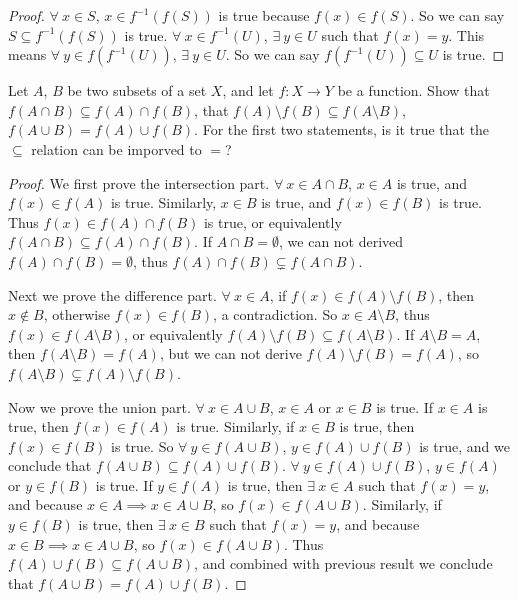 \begin{proof}
\(\forall\ x \in S\), \(x \in f^{-1}(f(S))\) is true because \(f(x) \in f(S)\).
So we can say \(S \subseteq f^{-1}(f(S))\) is true.
\(\forall\ x \in f^{-1}(U)\), \(\exists\ y \in U\) such that \(f(x) = y\).
This means \(\forall\ y \in f(f^{-1}(U))\), \(\exists\ y \in U\).
So we can say \(f(f^{-1}(U)) \subseteq U\) is true.
\end{proof}

\begin{exercise}\label{ex 3.4.3}
Let \(A\), \(B\) be two subsets of a set \(X\), and let \(f : X \to Y\) be a function.
Show that \(f(A \cap B) \subseteq f(A) \cap f(B)\), that \(f(A) \setminus f(B) \subseteq f(A \setminus B)\), \(f(A \cup B) = f(A) \cup f(B)\).
For the first two statements, is it true that the \(\subseteq\) relation can be imporved to \(=\)?
\end{exercise}

\begin{proof}
We first prove the intersection part.
\(\forall\ x \in A \cap B\), \(x \in A\) is true, and \(f(x) \in f(A)\) is true.
Similarly, \(x \in B\) is true, and \(f(x) \in f(B)\) is true.
Thus \(f(x) \in f(A) \cap f(B)\) is true, or equivalently \(f(A \cap B) \subseteq f(A) \cap f(B)\).
If \(A \cap B = \emptyset\), we can not derived \(f(A) \cap f(B) = \emptyset\), thus \(f(A) \cap f(B) \subsetneq f(A \cap B)\).

Next we prove the difference part.
\(\forall\ x \in A\), if \(f(x) \in f(A) \setminus f(B)\), then \(x \notin B\), otherwise \(f(x) \in f(B)\), a contradiction.
So \(x \in A \setminus B\), thus \(f(x) \in f(A \setminus B)\), or equivalently \(f(A) \setminus f(B) \subseteq f(A \setminus B)\).
If \(A \setminus B = A\), then \(f(A \setminus B) = f(A)\), but we can not derive \(f(A) \setminus f(B) = f(A)\), so \(f(A \setminus B) \subsetneq f(A) \setminus f(B)\).

Now we prove the union part.
\(\forall\ x \in A \cup B\), \(x \in A\) or \(x \in B\) is true.
If \(x \in A\) is true, then \(f(x) \in f(A)\) is true.
Similarly, if \(x \in B\) is true, then \(f(x) \in f(B)\) is true.
So \(\forall\ y \in f(A \cup B)\), \(y \in f(A) \cup f(B)\) is true, and we conclude that \(f(A \cup B) \subseteq f(A) \cup f(B)\).
\(\forall\ y \in f(A) \cup f(B)\), \(y \in f(A)\) or \(y \in f(B)\) is true.
If \(y \in f(A)\) is true, then \(\exists\ x \in A\) such that \(f(x) = y\), and because \(x \in A \implies x \in A \cup B\), so \(f(x) \in f(A \cup B)\).
Similarly, if \(y \in f(B)\) is true, then \(\exists\ x \in B\) such that \(f(x) = y\), and because \(x \in B \implies x \in A \cup B\), so \(f(x) \in f(A \cup B)\).
Thus \(f(A) \cup f(B) \subseteq f(A \cup B)\), and combined with previous result we conclude that \(f(A \cup B) = f(A) \cup f(B)\).
\end{proof}

